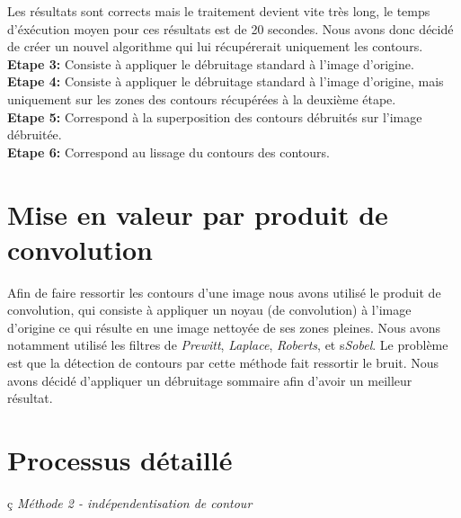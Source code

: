 \documentclass{article}
\begin{document}
			Les résultats sont corrects mais le traitement devient vite très long, le temps d'éxécution moyen pour ces résultats est de 20 secondes. Nous avons donc décidé de créer un nouvel algorithme qui lui récupérerait uniquement les contours.\\\textbf{Etape 3: }Consiste à appliquer le débruitage standard à l'image d'origine.\\
	\textbf{Etape 4: }Consiste à appliquer le débruitage standard à l'image d'origine, mais uniquement sur les zones des contours récupérées à la deuxième étape.\\
	\textbf{Etape 5: }Correspond à la superposition des contours débruités sur l'image débruitée.\\
	\textbf{Etape 6: }Correspond au lissage du contours des contours.\\
	
		\section{Mise en valeur par produit de convolution}
			Afin de faire ressortir les contours d'une image nous avons utilisé le produit de convolution, qui consiste à appliquer un noyau (de convolution) à l'image d'origine ce qui résulte en une image nettoyée de ses zones pleines. Nous avons notamment utilisé les filtres de \emph{Prewitt}, \emph{Laplace}, \emph{Roberts}, et s\emph{Sobel}. Le problème est que la détection de contours par cette méthode fait ressortir le bruit. Nous avons décidé d'appliquer un débruitage sommaire afin d'avoir un meilleur résultat.
	
		\section{Processus détaillé}
			ç
			\indent	\emph{Méthode 2 - indépendentisation de contour}\\
			
	
	\newpage
	
\end{document}
